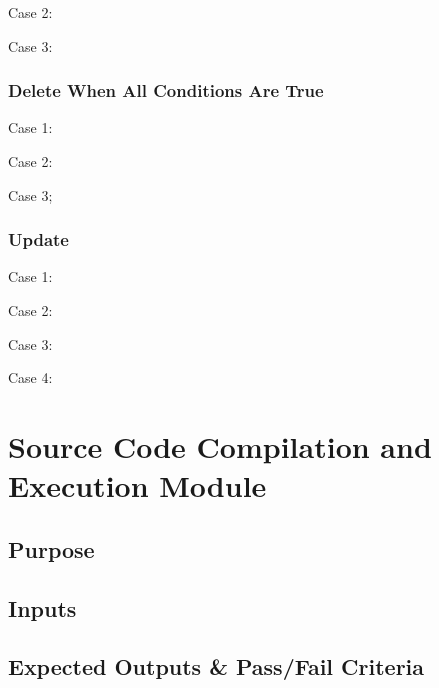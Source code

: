 Case 2:


Case 3:


\subsubsection{Delete When All Conditions Are True}
Case 1:


Case 2:


Case 3;


\subsubsection{Update}
Case 1:


Case 2:


Case 3:


Case 4:


\section{Source Code Compilation and Execution Module}
\subsection{Purpose}

\subsection{Inputs}

\subsection{Expected Outputs \& Pass/Fail Criteria}
